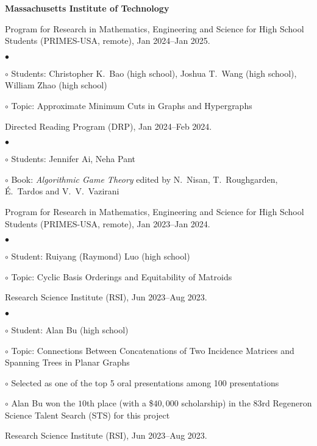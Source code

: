 \documentclass[margin,line]{res}
\newenvironment{list2}{
  \begin{list}{$\bullet$}{%
      \setlength{\itemsep}{0in}
      \setlength{\parsep}{0in} \setlength{\parskip}{0in}
      \setlength{\topsep}{0in} \setlength{\partopsep}{0in}
      \setlength{\leftmargin}{0.2in}}}{\end{list}}
\newenvironment{list3}{
  \begin{list}{\ding{113}}{%
      \setlength{\itemsep}{0.05in}
      \setlength{\parsep}{0.025in} \setlength{\parskip}{0in}
      \setlength{\topsep}{0in} \setlength{\partopsep}{0in}
      \setlength{\leftmargin}{0.17in}}}{\end{list}}
\begin{document}
\begin{resume}
{\bf Massachusetts Institute of Technology}\\
\vspace*{-.1in}
\begin{list3}
\item[] Program for Research in Mathematics, Engineering and Science for High School Students (PRIMES-USA, remote), Jan 2024--Jan 2025.
  \begin{list2}
  \item[$\circ$] Students: Christopher K.\ Bao (high school), Joshua T.\ Wang (high school), William Zhao (high school)
  \item[$\circ$] Topic: Approximate Minimum Cuts in Graphs and Hypergraphs
  \end{list2}
\item[] Directed Reading Program (DRP), Jan 2024--Feb 2024.
  \begin{list2}
  \item[$\circ$] Students: Jennifer Ai, Neha Pant
  \item[$\circ$] Book: \emph{Algorithmic Game Theory} edited by N.\ Nisan, T.\ Roughgarden, \'E.\ Tardos and V.\ V.\ Vazirani
  \end{list2}
\item[] Program for Research in Mathematics, Engineering and Science for High School Students (PRIMES-USA, remote), Jan 2023--Jan 2024.
  \begin{list2}
  \item[$\circ$] Student: Ruiyang (Raymond) Luo (high school)
  \item[$\circ$] Topic: Cyclic Basis Orderings and Equitability of Matroids
  \end{list2}
\item[] Research Science Institute (RSI), Jun 2023--Aug 2023.
  \begin{list2}
  \item[$\circ$] Student: Alan Bu (high school)
  \item[$\circ$] Topic: Connections Between Concatenations of Two Incidence Matrices and Spanning Trees in Planar Graphs
  \item[$\circ$] Selected as one of the top 5 oral presentations among 100 presentations
  \item[$\circ$] Alan Bu won the $10$th place (with a \$$40,000$ scholarship) in the $83$rd Regeneron Science Talent Search (STS) for this project
  \end{list2}
\item[] Research Science Institute (RSI), Jun 2023--Aug 2023.

\end{list3}
\end{resume}
\end{document}
